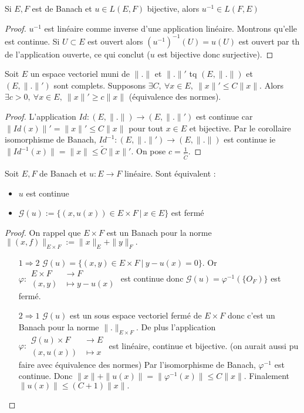 \begin{corollaire}
    Si $E,F$ est de Banach et $u\in L(E,F)$ bijective, alors $u^{-1} \in L(F,E)$
\end{corollaire}
\begin{proof}
    $u^{-1} $ est linéaire comme inverse d'une application linéaire. Montrons qu'elle est continue. Si $U\subset E$ est ouvert alors $(u^{-1})^{-1} (U)=u(U) $ est ouvert par th de l'application ouverte, ce qui conclut ($u$ est bijective donc surjective).
\end{proof}
\begin{corollaire}
    Soit $E$ un espace vectoriel muni de $\|.\|$ et $\|.\|'$ tq $(E,\|.\|)$ et $(E,\|.\|')$ sont complets. Supposons $\exists C,\ \forall x\in E,\ \|x\|'\le C\|x\|. $ Alors $\exists c>0,\ \forall x\in E,\ \|x\|'\ge  c\|x\| $ (équivalence des normes).
\end{corollaire}
\begin{proof}
    L'application $Id:(E,\|.\|)\to (E,\|.\|')$ est continue car $\|Id(x)\|'=\|x\|'\le C\|x\|$ pour tout $x\in E$ et bijective. Par le corollaire isomorphisme de Banach, $Id^{-1} : (E,\|.\|')\to (E,\|.\|)$ est continue ie $\|Id^{-1} (x)\|=\|x\|\le \tilde{C}\|x\|'.$ On pose $c=\frac{1}{\tilde{C}}$.
\end{proof}
\begin{theoreme}
    Soit $E,F$ de Banach et $u:E\to F$ linéaire. Sont équivalent :
    \begin{itemize}
        \item $u$ est continue
        \item $\mathcal{G}(u):=\{(x,u(x))\in E\times F\ |\ x\in E\} $ est fermé
    \end{itemize}
\end{theoreme}
\begin{proof}
    On rappel que $E\times F$ est un Banach pour la norme $\|(x,f)\|_{E\times F}:=\|x\|_E+\|y\|_F.$
    \begin{itemize}
        \item[$1\Rightarrow 2$] $\mathcal{G}(u)=\{(x,y)\in E\times F\ |\ y-u(x)=0\} $. Or $\varphi  :\begin{aligned}
            E\times F &\longrightarrow F \\
            (x,y) &\longmapsto y-u(x)
        \end{aligned}$ est continue donc $\mathcal{G}(u)=\varphi ^{-1} (\{O_F)\} $ est fermé.
    \item[$2\Rightarrow 1$] $\mathcal{G}(u)$ est un sous espace vectoriel fermé de $E\times F$ donc c'est un Banach pour la norme $\|.\|_{E\times F}.$ De plus l'application $\varphi : \begin{aligned}
         \mathcal{G}(u)\times F&\longrightarrow E \\
         (x,u(x))&\longmapsto x
    \end{aligned}$ est linéaire, continue et bijective. (on aurait aussi pu faire avec équivalence des normes) Par l'isomorphisme de Banach, $\varphi ^{-1} $ est continue. Donc $\|x\|+\|u(x)\|=\|\varphi ^{-1}  (x)\|\le C\|x\|.$ Finalement $\|u(x)\|\le (C+1)\|x\|.$
    \end{itemize}

\end{proof}
